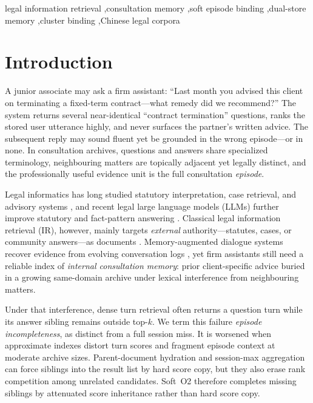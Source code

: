 \documentclass[preprint,12pt,authoryear]{elsarticle}
\begin{document}
\begin{frontmatter}
\begin{keyword}
legal information retrieval \sep consultation memory \sep soft episode binding \sep dual-store memory \sep cluster binding \sep Chinese legal corpora
\end{keyword}

\end{frontmatter}

\linenumbers

\section{Introduction}\label{sec:intro}

A junior associate may ask a firm assistant: ``Last month you advised this client on terminating a fixed-term contract---what remedy did we recommend?''
The system returns several near-identical ``contract termination'' questions, ranks the stored user utterance highly, and never surfaces the partner's written advice.
The subsequent reply may sound fluent yet be grounded in the wrong episode---or in none.
In consultation archives, questions and answers share specialized terminology, neighbouring matters are topically adjacent yet legally distinct, and the professionally useful evidence unit is the full consultation \emph{episode}.

Legal informatics has long studied statutory interpretation, case retrieval, and advisory systems \cite{martinezgil2023survey, ashley2017artificial}, and recent legal large language models (LLMs) further improve statutory and fact-pattern answering \cite{yue2023disclawllm, huang2023lawyer, yue2024lawllm}.
Classical legal information retrieval (IR), however, mainly targets \emph{external} authority---statutes, cases, or community answers---as documents \cite{askari2024legalqa, louis2024lleqa, liu2022query, zhang2024event}.
Memory-augmented dialogue systems recover evidence from evolving conversation logs \cite{wu2025longmemeval, maharana2024evaluating, packer2023memgpt}, yet firm assistants still need a reliable index of \emph{internal consultation memory}: prior client-specific advice buried in a growing same-domain archive under lexical interference from neighbouring matters.

Under that interference, dense turn retrieval often returns a question turn while its answer sibling remains outside top-$k$.
We term this failure \emph{episode incompleteness}, as distinct from a full session miss.
It is worsened when approximate indexes distort turn scores and fragment episode context at moderate archive sizes.
Parent-document hydration and session-max aggregation can force siblings into the result list by hard score copy, but they also erase rank competition among unrelated candidates.
Soft~O2 therefore completes missing siblings by attenuated score inheritance rather than hard score copy.
\end{document}
